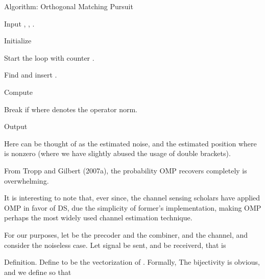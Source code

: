 \Result
{Algorithm: Orthogonal Matching Pursuit}
{
\startitemize[n]
\item Input , , .
\item Initialize
\item Start the loop with counter .
\item Find
and insert .
\item Compute
\item Break if
where  denotes the operator norm.
\item Output 
\stopitemize
}
Here  can be thought of as the estimated noise, and  the estimated position where  is nonzero (where we have slightly abused the usage of double brackets).

From Tropp and Gilbert (2007a), the probability OMP recovers  completely is overwhelming.

It is interesting to note that, ever since, the channel sensing scholars have applied OMP in favor of DS, due the simplicity of former's implementation, making OMP perhaps the most widely used channel estimation technique.

For our purposes, let  be the precoder and  the combiner, and  the channel, and consider the noiseless case.
Let signal  be sent, and  be receiverd, that is


\Result
{Definition.}
{
Define  to be the vectorization of .
Formally,
The bijectivity is obvious, and we define  so that
}

